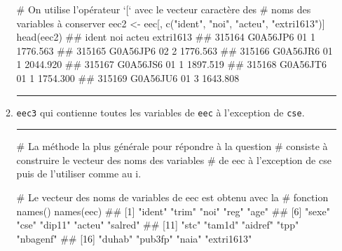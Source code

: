 \documentclass[12pt,twosided, notitlepage]{book}
\newenvironment{Shaded}{}{}
\newcommand{\KeywordTok}[1]{\textcolor[rgb]{0.00,0.00,1.00}{#1}}
\newcommand{\StringTok}[1]{\textcolor[rgb]{0.00,0.50,0.50}{#1}}
\newcommand{\CommentTok}[1]{\textcolor[rgb]{0.00,0.50,0.00}{#1}}
\newcommand{\NormalTok}[1]{#1}
\newif \ifsol
\renewenvironment{Shaded}{\begin{snugshade}}{\end{snugshade}}
\begin{document}
\begin{enumerate}
\begin{enumerate}
\begin{Shaded}
\begin{Highlighting}[]
\CommentTok{# On utilise l'opérateur `[` avec le vecteur caractère des}
\CommentTok{# noms des variables à conserver}
\NormalTok{eec2 <-}\StringTok{ }\NormalTok{eec[, }\KeywordTok{c}\NormalTok{(}\StringTok{"ident"}\NormalTok{, }\StringTok{"noi"}\NormalTok{, }\StringTok{"acteu"}\NormalTok{, }\StringTok{"extri1613"}\NormalTok{)]}
\KeywordTok{head}\NormalTok{(eec2)}
\NormalTok{  ##           ident noi acteu extri1613}
\NormalTok{  ## 315164 G0A56JP6  01     1  1776.563}
\NormalTok{  ## 315165 G0A56JP6  02     2  1776.563}
\NormalTok{  ## 315166 G0A56JR6  01     1  2044.920}
\NormalTok{  ## 315167 G0A56JS6  01     1  1897.519}
\NormalTok{  ## 315168 G0A56JT6  01     1  1754.300}
\NormalTok{  ## 315169 G0A56JU6  01     3  1643.808}
\end{Highlighting}
\end{Shaded}

    \begin{center} \rule{0.5\linewidth}{\linethickness}\end{center}

    \bigskip  \fi 
  \item
    \texttt{eec3} qui contienne toutes les variables de \texttt{eec} à
    l'exception de \texttt{cse}.

    \ifsol  \textbf{Indication} Comment utiliseriez-vous les opérations
    ensemblistes sur les vecteurs (\emph{cf.} module 2) pour créer le
    vecteur des noms des variables de la table \texttt{eec} SAUF
    \texttt{cse} ? Utilisez-le comme au i. pour sélectionner toutes les
    variables sauf \texttt{cse}.\fi 

    \ifsol 

    \begin{center} \rule{0.5\linewidth}{\linethickness}\end{center}

\begin{Shaded}
\begin{Highlighting}[]
\CommentTok{# La méthode la plus générale pour répondre à la question}
\CommentTok{# consiste à construire le vecteur des noms des variables}
\CommentTok{# de eec à l'exception de cse puis de l'utiliser comme au i. }

\CommentTok{# Le vecteur des noms de variables de eec est obtenu avec la}
\CommentTok{# fonction names()}
\KeywordTok{names}\NormalTok{(eec)}
\NormalTok{  ##  [1] "ident"     "trim"      "noi"       "reg"       "age"      }
\NormalTok{  ##  [6] "sexe"      "cse"       "dip11"     "acteu"     "salred"   }
\NormalTok{  ## [11] "stc"       "tam1d"     "aidref"    "tpp"       "nbagenf"  }
\NormalTok{  ## [16] "duhab"     "pub3fp"    "naia"      "extri1613"}


\end{Highlighting}
\end{Shaded}
\end{enumerate}
\end{enumerate}
\end{document}

